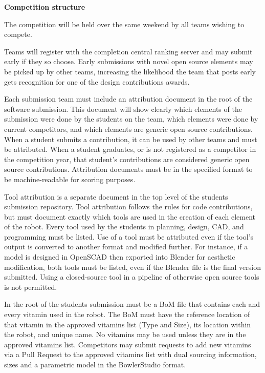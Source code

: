 \documentclass{article}
\begin{document}
 \pagebreak

{\huge \textbf{Competition structure}}

The competition will be held over the same weekend by all teams wishing to compete. 

Teams will register with the completion central ranking server and may submit early if they so choose. Early submissions with novel open source elements may be picked up by other teams, increasing the likelihood the team that posts early gets recognition for one of the design contributions awards.

Each submission team must include an attribution document in the root of the software submission. This document will show clearly which elements of the submission were done by the students on the team, which elements were done by current competitors, and which elements are generic open source contributions. When a student submits a contribution, it can be used by other teams and must be attributed. When a student graduates, or is not registered as a competitor in the competition year, that student's contributions are considered generic open source contributions.  Attribution documents must be in the specified format to be machine-readable for scoring purposes. 

Tool attribution is a separate document in the top level of the students submission repository. Tool attribution follows the rules for code contributions, but must document exactly which tools are used in the creation of each element of the robot. Every tool used by the students in planning, design, CAD, and programming must be listed. Use of a tool must be attributed even if the tool's output is converted to another format and modified further. For instance, if a model is designed in OpenSCAD then exported into Blender for aesthetic modification, both tools must be listed, even if the Blender file is the final version submitted. Using a closed-source tool in a pipeline of otherwise open source tools is not permitted. 

In the root of the students submission must be a BoM file that contains each and every vitamin used in the robot. The BoM must have the reference location of that vitamin in the approved vitamins list (Type and Size), its location within the robot, and unique name. No vitamins may be used unless they are in the approved vitamins list. Competitors may submit requests to add new vitamins via a Pull Request to the approved vitamins list with dual sourcing information, sizes and a parametric model in the BowlerStudio format. 
\end{document}
